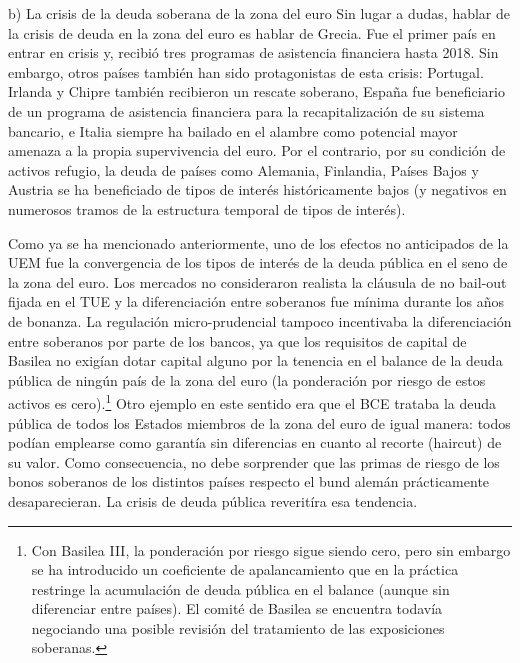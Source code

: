 \documentclass[10pt,a4paper]{article}
\begin{document}
b) La crisis de la deuda soberana de la zona del euro 
Sin lugar a dudas, hablar de la crisis de deuda en la zona del euro es hablar de Grecia. Fue el primer país en entrar en crisis y, recibió tres programas de asistencia financiera hasta 2018. Sin embargo, otros países también han sido protagonistas de esta crisis: Portugal. Irlanda y Chipre también recibieron un rescate soberano, España fue beneficiario de un programa de asistencia financiera para la recapitalización de su sistema bancario, e Italia siempre ha bailado en el alambre como potencial mayor amenaza a la propia supervivencia del euro. Por el contrario, por su condición de activos refugio, la deuda de países como Alemania, Finlandia, Países Bajos y Austria se ha beneficiado de tipos de interés históricamente bajos (y negativos en numerosos tramos de la estructura temporal de tipos de interés). 

Como ya se ha mencionado anteriormente, uno de los efectos no anticipados de la UEM fue la convergencia de los tipos de interés de la deuda pública en el seno de la zona del euro. Los mercados no consideraron realista la cláusula de no bail-out fijada en el TUE y la diferenciación entre soberanos fue mínima durante los años de bonanza. La regulación micro-prudencial tampoco incentivaba la diferenciación entre soberanos por parte de los bancos, ya que los requisitos de capital de Basilea no exigían dotar capital alguno por la tenencia en el balance de la deuda pública de ningún país de la zona del euro (la ponderación por riesgo de estos activos es cero).\footnote{%
    Con Basilea III, la ponderación por riesgo sigue siendo cero, pero sin embargo se ha introducido un coeficiente de apalancamiento que en la práctica restringe la acumulación de deuda pública en el balance (aunque sin diferenciar entre países). El comité de Basilea se encuentra todavía negociando una posible revisión del tratamiento de las exposiciones soberanas.
} Otro ejemplo en este sentido era que el BCE trataba la deuda pública de todos los Estados miembros de la zona del euro de igual manera: todos podían emplearse como garantía sin diferencias en cuanto al recorte (haircut) de su valor. Como consecuencia, no debe sorprender que las primas de riesgo de los bonos soberanos de los distintos países respecto el bund alemán prácticamente desaparecieran. La crisis de deuda pública reveritíra esa tendencia.
\end{document}
